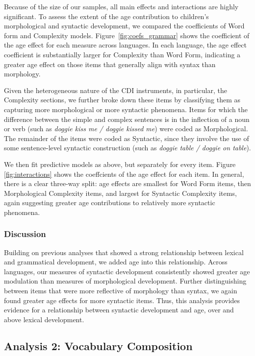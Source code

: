 \documentclass[10pt,letterpaper]{article}
\begin{document}
Because of the size of our samples, all main effects and interactions are highly significant. To assess the extent of the age contribution to children's morphological and syntactic development, we compared the coefficients of Word form and Complexity models. Figure~\ref{fig:coefs_grammar} shows the coefficient of the age effect for each measure across languages. In each language, the age effect coefficient is substantially larger for Complexity than Word Form, indicating a greater age effect on those items that generally align with syntax than morphology.

Given the heterogeneous nature of the CDI instruments, in particular, the Complexity sections, we further broke down these items by classifying them as capturing more morphological or more syntactic phenomena. Items for which the difference between the simple and complex sentences is in the inflection of a noun or verb (such as \emph{doggie kiss me / doggie kissed me}) were coded as Morphological. The remainder of the items were coded as Syntactic, since they involve the use of some sentence-level syntactic construction (such as \emph{doggie table / doggie on table}).

We then fit predictive models as above, but separately for every item. Figure \ref{fig:interactions} shows the coeffcients of the age effect for each item. In general, there is a clear three-way split: age effects are smallest for Word Form items, then Morphological Complexity items, and largest for Syntactic Complexity items, again suggesting greater age contributions to relatively more syntactic phenomena. 

\subsubsection{Discussion}

Building on previous analyses that showed a strong relationship between lexical and grammatical development, we added age into this relationship. Across languages, our measures of syntactic development consistently showed greater age modulation than measures of morphological development. Further distinguishing between items that were more reflective of morphology than syntax, we again found greater age effects for more syntactic items. Thus, this analysis provides evidence for a relationship between syntactic development and age, over and above lexical development.

\subsection{Analysis 2: Vocabulary Composition}
\end{document}
